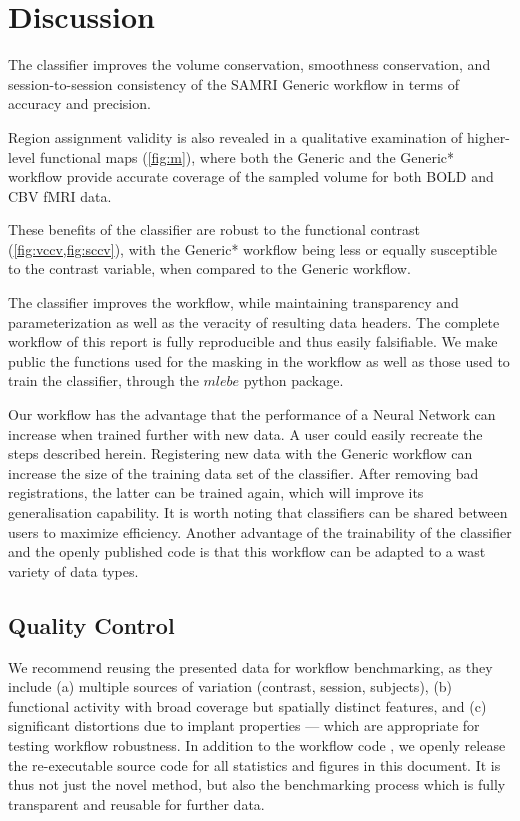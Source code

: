 \section{Discussion}

The classifier improves the volume conservation, smoothness conservation, and session-to-session consistency of the SAMRI Generic workflow in terms of accuracy and precision.

Region assignment validity is also revealed in a qualitative examination of higher-level functional maps (\cref{fig:m}), where both the Generic and the Generic* workflow provide accurate coverage of the sampled volume for both BOLD and CBV fMRI data.

These benefits of the classifier are robust to the functional contrast (\cref{fig:vccv,fig:sccv}), with the Generic* workflow being less or equally susceptible to the contrast variable, when compared to the Generic workflow.

The classifier improves the workflow, while maintaining transparency and parameterization as well as the veracity of resulting data headers.
The complete workflow of this report is fully reproducible and thus easily falsifiable.
We make public the functions used for the masking in the workflow as well as those used to train the classifier, through the \textcolor{mg}{\texttt{$mlebe$}} python package.

Our workflow has the advantage that the performance of a Neural Network can increase when trained further with new data.
A user could easily recreate the steps described herein.
Registering new data with the Generic workflow can increase the size of the training data set of the classifier.
After removing bad registrations, the latter can be trained again, which will improve its generalisation capability.
It is worth noting that classifiers can be shared between users to maximize efficiency.
Another advantage of the trainability of the classifier and the openly published code is that this workflow can be adapted to a wast variety of data types.

\subsection{Quality Control}

We recommend reusing the presented data for workflow benchmarking, as they include (a) multiple sources of variation (contrast, session, subjects), (b) functional activity with broad coverage but spatially distinct features, and (c) significant distortions due to implant properties --- which are appropriate for testing workflow robustness.
In addition to the workflow code \cite{mlebe, samri}, we openly release the re-executable source code \cite{mlebe_repsep} for all statistics and figures in this document.
It is thus not just the novel method, but also the benchmarking process which is fully transparent and reusable for further data.

